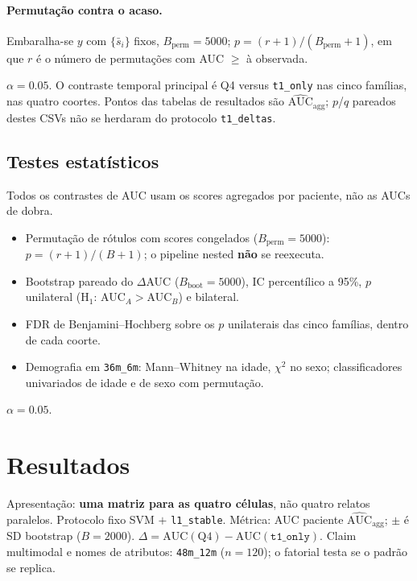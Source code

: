 \documentclass[review]{elsarticle}
\newcommand{\code}[1]{\texttt{#1}}
\begin{document}
\paragraph{Permutação contra o acaso.}
Embaralha-se $y$ com $\{\bar{s}_i\}$ fixos, $B_{\mathrm{perm}}=5000$;
$p=(r+1)/(B_{\mathrm{perm}}+1)$, em que $r$ é o número de permutações com AUC $\ge$ à observada.

$\alpha=0.05$.
O contraste temporal principal é Q4 versus \code{t1\_only} nas cinco famílias, nas quatro coortes.
Pontos das tabelas de resultados são $\widehat{\mathrm{AUC}}_{\mathrm{agg}}$; $p$/$q$ pareados destes CSVs não se herdaram do protocolo \code{t1\_deltas}.

\subsection{Testes estatísticos}
\label{sec:testes}

Todos os contrastes de AUC usam os scores agregados por paciente, não as AUCs de dobra.
\begin{itemize}
\item Permutação de rótulos com scores congelados ($B_{\mathrm{perm}}=5000$): $p=(r+1)/(B+1)$; o pipeline nested \textbf{não} se reexecuta.
\item Bootstrap pareado do $\Delta$AUC ($B_{\mathrm{boot}}=5000$), IC percentílico a 95\%, $p$ unilateral (H$_1$: AUC$_A>$AUC$_B$) e bilateral.
\item FDR de Benjamini--Hochberg sobre os $p$ unilaterais das cinco famílias, dentro de cada coorte.
\item Demografia em \code{36m\_6m}: Mann--Whitney na idade, $\chi^2$ no sexo; classificadores univariados de idade e de sexo com permutação.
\end{itemize}
$\alpha=0.05$.

\section{Resultados}\label{sec:Results}

Apresentação: \textbf{uma matriz para as quatro células}, não quatro relatos paralelos.
Protocolo fixo SVM $+$ \code{l1\_stable}.
Métrica: AUC paciente $\widehat{\mathrm{AUC}}_{\mathrm{agg}}$; $\pm$ é SD bootstrap ($B=2000$).
$\Delta=\mathrm{AUC}(\mathrm{Q4})-\mathrm{AUC}(\code{t1\_only})$.
Claim multimodal e nomes de atributos: \code{48m\_12m} ($n=120$); o fatorial testa se o padrão se replica.
\end{document}
